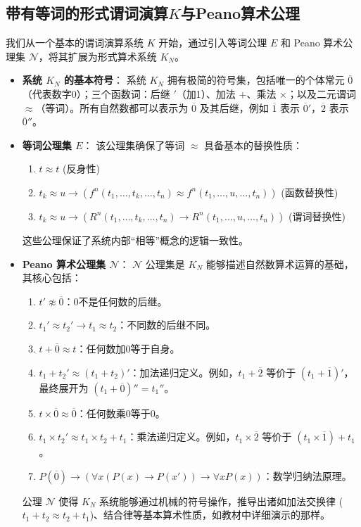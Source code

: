 \documentclass[a4paper,12pt]{ctexart}
\begin{document}
\subsection{带有等词的形式谓词演算$K$与Peano算术公理}
我们从一个基本的谓词演算系统 $K$ 开始，通过引入等词公理 $E$ 和 Peano 算术公理集 $\mathcal{N}$，将其扩展为形式算术系统 $K_N$。
\begin{itemize}[leftmargin=*,noitemsep,topsep=0pt]
    \item \textbf{系统 $K_N$ 的基本符号}：
    系统 $K_N$ 拥有极简的符号集，包括唯一的个体常元 $\overline{0}$（代表数字0）；三个函数词：后继 $'$（加1）、加法 $+$、乘法 $\times$；以及二元谓词 $\approx$（等词）。所有自然数都可以表示为 $\overline{0}$ 及其后继，例如 $\overline{1}$ 表示 $\overline{0}'$，$\overline{2}$ 表示 $\overline{0}''$。

    \item \textbf{等词公理集 $E$}：
    该公理集确保了等词 $\approx$ 具备基本的替换性质：
    \begin{enumerate}[label=(E\arabic*)]
        \item $t \approx t$ (反身性)
        \item $t_k \approx u \rightarrow (f^n(t_1, \dots, t_k, \dots, t_n) \approx f^n(t_1, \dots, u, \dots, t_n))$ (函数替换性)
        \item $t_k \approx u \rightarrow (R^n(t_1, \dots, t_k, \dots, t_n) \rightarrow R^n(t_1, \dots, u, \dots, t_n))$ (谓词替换性)
    \end{enumerate}
    这些公理保证了系统内部“相等”概念的逻辑一致性。

    \item \textbf{Peano 算术公理集 $\mathcal{N}$}：
    $\mathcal{N}$ 公理集是 $K_N$ 能够描述自然数算术运算的基础，其核心包括：
    \begin{enumerate}[label=(N\arabic*)]
        \item $t' \not\approx \overline{0}$：0不是任何数的后继。
        \item $t_1' \approx t_2' \rightarrow t_1 \approx t_2$：不同数的后继不同。
        \item $t + \overline{0} \approx t$：任何数加0等于自身。
        \item $t_1 + t_2' \approx (t_1 + t_2)'$：加法递归定义。例如，$t_1 + \overline{2}$ 等价于 $(t_1 + \overline{1})'$，最终展开为 $(t_1 + \overline{0})'' = t_1''$。
        \item $t \times \overline{0} \approx \overline{0}$：任何数乘0等于0。
        \item $t_1 \times t_2' \approx t_1 \times t_2 + t_1$：乘法递归定义。例如，$t_1 \times \overline{2}$ 等价于 $(t_1 \times \overline{1}) + t_1$。
        \item $P(\overline{0}) \rightarrow (\forall x (P(x) \rightarrow P(x')) \rightarrow \forall x P(x))$：数学归纳法原理。
    \end{enumerate}
    公理 $\mathcal{N}$ 使得 $K_N$ 系统能够通过机械的符号操作，推导出诸如加法交换律 ($t_1 + t_2 \approx t_2 + t_1$)、结合律等基本算术性质，如教材中详细演示的那样。
\end{itemize}
\end{document}
